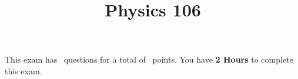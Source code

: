 

\usepackage{color}
\lstset{numbers=left}


\printanswers

\title{Physics 106}
\maketitle



\begin{center}
    This exam has \numquestions\ questions for a total of \numpoints\
    points. You have {\bf 2 Hours} to complete this exam.
\end{center}

